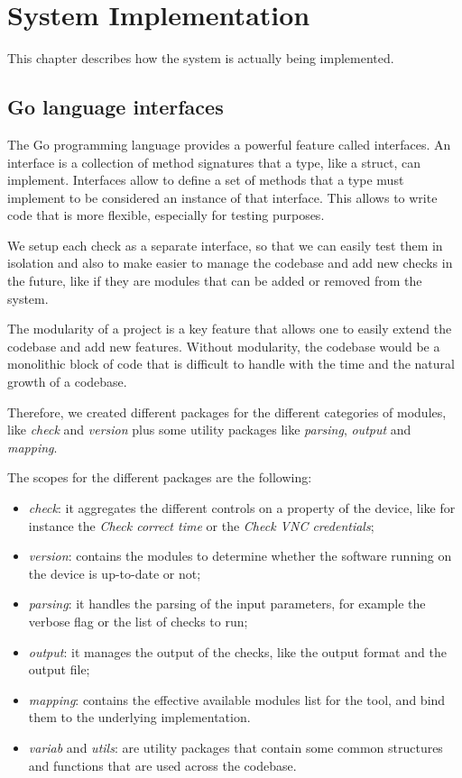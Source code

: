 \chapter{System Implementation}

This chapter describes how the system is actually being implemented.

\section{Go language interfaces}

The Go programming language provides a powerful feature called interfaces. An interface is a collection of method signatures that a type, like a struct, can implement. Interfaces allow to define a set of methods that a type must implement to be considered an instance of that interface. This allows to write code that is more flexible, especially for testing purposes.

We setup each check as a separate interface, so that we can easily test them in isolation and also to make easier to manage the codebase and add new checks in the future, like if they are modules that can be added or removed from the system.

The modularity of a project is a key feature that allows one to easily extend the codebase and add new features. Without modularity, the codebase would be a monolithic block of code that is difficult to handle with the time and the natural growth of a codebase.

Therefore, we created different packages for the different categories of modules, like \textit{check} and \textit{version} plus some utility packages like \textit{parsing}, \textit{output} and \textit{mapping}.

The scopes for the different packages are the following:

\begin{itemize}
  \item \textit{check}: it aggregates the different controls on a property of the device, like for instance the \textit{Check correct time} or the \textit{Check VNC credentials};
  \item \textit{version}: contains the modules to determine whether the software running on the device is up-to-date or not;
  \item \textit{parsing}: it handles the parsing of the input parameters, for example the verbose flag or the list of checks to run;
  \item \textit{output}: it manages the output of the checks, like the output format and the output file;
  \item \textit{mapping}: contains the effective available modules list for the tool, and bind them to the underlying implementation.
  \item \textit{variab} and \textit{utils}: are utility packages that contain some common structures and functions that are used across the codebase.
\end{itemize}

